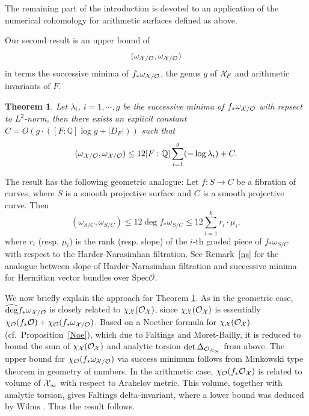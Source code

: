 \documentclass[]{amsart}
\newcommand{\BQ}{{\mathbb {Q}}} \newcommand{\BR}{{\mathbb {R}}}
\newcommand{\CO}{{\mathcal {O}}} \newcommand{\CP}{{\mathcal {P}}}
\newcommand{\Spec}{{\mathrm{Spec}}} \newcommand{\Spf}{{\mathrm{Spf}}}
\newcommand{\wh}{\widehat}
\newcommand{\ra}{\rightarrow} \newcommand{\imp}{\Longrightarrow}
\theoremstyle{plain}
\newtheorem{thm}{Theorem}[section] \newtheorem{cor}[thm]{Corollary}
\theoremstyle{remark} \newtheorem{remark}[thm]{Remark}
\theoremstyle{remark} \newtheorem{exercise}{Exercise}
\theoremstyle{remark} \newtheorem{example}{Example}
\numberwithin{equation}{section}
\begin{document}
The remaining part of the introduction is devoted to an application of the numerical cohomology for arithmetic surfaces defined as above.

 
 Our second result is an upper bound of \[(\omega_{\CX/\CO},\omega_{\CX/\CO})\] in terms the successive minima of $f_*\omega_{\CX/\CO}$, the genus $g$ of ${\mathcal {X}}_F$ and arithmetic invariants of $F$.
\begin{thm}\label{main:int2}
Let $\lambda_i$, $i=1,\cdots, g$ be the successive minima of $f_*\omega_{\CX/\CO}$ with repsect to $L^2$-norm, then there exists an explicit constant $C=O(g\cdot([F:\BQ]\log g +|D_F|))$ such that 
\[(\omega_{\CX/\CO},\omega_{\CX/\CO})\leq 12[F:\BQ]\sum_{i=1}^{g}(-\log\lambda_i)+C.\]
\end{thm}
The result has the following geometric analogue: Let $f: S\ra C$ be a fibration of curves, where $S$ is a smooth projective surface and $C$ is a smooth projective curve.  Then 
\[(\omega_{S/C},\omega_{S/C})\leq 12 \deg f_*\omega_{S/C}\leq 12\sum_{i=1}^k r_i\cdot \mu_i,\]where $r_i$ (resp. $\mu_i$) is the rank (resp. slope) of the $i$-th graded piece of $f_*\omega_{S/C}$ with respect to the Harder-Narasimhan filtration. See Remark~\ref{ns} for the analogue between slope of Harder-Narasimhan filtration and successive minima for Hermitian vector bundles over $\Spec\CO$.



We now briefly explain the approach for Theorem \ref{main:int2}. As in the geometric case, $\wh{\deg}f_*\omega_{\CX/\CO}$ is closely related to $\chi_{\CX}(\CO_{\CX})$, since $\chi_{\CX}(\CO_{\CX})$ is essentially $\chi_{\CO}(f_*\CO)+\chi_{\CO}(f_*\omega_{\CX/\CO})$. Based on a Noether formula for $\chi_{\CX}(\CO_{\CX})$ (cf.~Proposition~\ref{Noe}), which due to Faltings and Moret-Bailly, it is reduced to bound the sum of $\chi_{\CX}(\CO_{\CX})$ and analytic torsion $\det \Delta_{\CO_{\CX_\infty}}$ from above. 
The upper bound for $\chi_{\CO}(f_*\omega_{\CX/\CO})$ via success minimum follows from Minkowski type theorem in geometry of numbers. In the arithmetic case, $\chi_{\CO}(f_*\CO_{\CX})$ is related to volume of ${\mathcal {X}}_\infty$ with respect to Arakelov metric. This volume, together with analytic torsion, gives Faltings delta-invariant, where a lower bound was deduced by Wilms \cite{Wilms:2017}. Thus the result follows.





 
 
\end{document}
